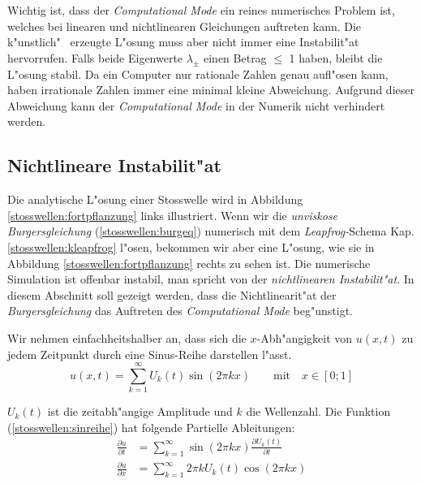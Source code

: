 \begin{refsection}
Wichtig ist, dass der \textit{Computational Mode} ein reines numerisches
Problem ist, welches bei linearen und nichtlinearen Gleichungen auftreten
kann. Die \grqq k"unstlich" \, erzeugte L"osung muss aber nicht immer
eine Instabilit"at hervorrufen. Falls beide Eigenwerte $\lambda_\pm$
einen Betrag $\leq$ 1 haben, bleibt die L"osung stabil. Da ein Computer
nur rationale Zahlen genau aufl"osen kann, haben irrationale Zahlen
immer eine minimal kleine Abweichung. Aufgrund dieser Abweichung kann
der \textit{Computational Mode} in der Numerik nicht verhindert werden.


\subsection{Nichtlineare Instabilit"at}
Die analytische L"osung einer Stosswelle wird in Abbildung
\ref{stosswellen:fortpflanzung} links illustriert. Wenn wir die
\textit{unviskose Burgersgleichung} (\ref{stosswellen:burgeq}) numerisch
mit dem \textit{Leapfrog-}Schema Kap. \ref{stosswellen:kleapfrog}
l"osen, bekommen wir aber eine L"osung, wie sie in Abbildung
\ref{stosswellen:fortpflanzung} rechts zu sehen ist. Die
numerische Simulation ist offenbar instabil, man spricht von der
\textit{nichtlinearen Instabilit"at}. In diesem Abschnitt soll gezeigt
werden, dass die Nichtlinearit"at der \textit{Burgersgleichung} das
Auftreten des \textit{Computational Mode} beg"unstigt. 

Wir nehmen einfachheitshalber an, dass sich die $x$-Abh"angigkeit von
$u(x,t)$ zu jedem Zeitpunkt durch eine Sinus-Reihe darstellen l"asst.
\begin{equation}
	u(x,t) = \sum_{k=1}^{\infty} U_{k}(t) \sin(2\pi kx) \qquad \text{mit} \quad x \in[0;1]
	\label{stosswellen:sinreihe}
\end{equation} 

$U_{k}(t)$ ist die zeitabh"angige Amplitude und $k$ die Wellenzahl. 
Die Funktion (\ref{stosswellen:sinreihe}) hat folgende Partielle Ableitungen:
\begin{align*}
	\frac{\partial u}{\partial t}&=
	\sum_{k=1}^{\infty} \sin(2\pi k x) \frac{\partial U_{k}(t)}{\partial t}
\\
	\frac{\partial u}{\partial x}&=
	\sum_{k=1}^{\infty} 2\pi k U_{k}(t) \cos(2\pi k x) 
\end{align*}


\end{refsection}
